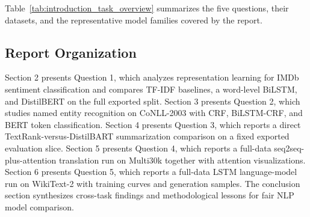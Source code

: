 Table~\ref{tab:introduction_task_overview} summarizes the five questions, their datasets, and the representative model families covered by the report.



\subsection{Report Organization}

Section 2 presents Question 1, which analyzes representation learning for IMDb sentiment classification and compares TF-IDF baselines, a word-level BiLSTM, and DistilBERT on the full exported split. Section 3 presents Question 2, which studies named entity recognition on CoNLL-2003 with CRF, BiLSTM-CRF, and BERT token classification. Section 4 presents Question 3, which reports a direct TextRank-versus-DistilBART summarization comparison on a fixed exported evaluation slice. Section 5 presents Question 4, which reports a full-data seq2seq-plus-attention translation run on Multi30k together with attention visualizations. Section 6 presents Question 5, which reports a full-data LSTM language-model run on WikiText-2 with training curves and generation samples. The conclusion section synthesizes cross-task findings and methodological lessons for fair NLP model comparison.